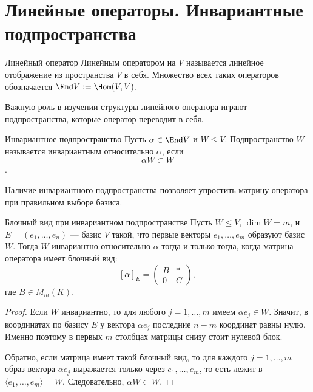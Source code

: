 
\section{Линейные операторы. Инвариантные подпространства}

\begin{Definition}{Линейный оператор}{}
	Линейным оператором на $V$ называется линейное отображение из пространства $V$ в себя. Множество всех таких операторов обозначается $\End V:=\Hom(V,V)$.
\end{Definition}

Важную роль в изучении структуры линейного оператора играют подпространства, которые оператор переводит в себя.

\begin{Definition}{Инвариантное подпространство}{}
	Пусть $\alpha\in \End V$ и $W\le V$. Подпространство $W$ называется инвариантным относительно $\alpha$, если
	\[
	\alpha W\subset W
	\].
\end{Definition}

Наличие инвариантного подпространства позволяет упростить матрицу оператора при правильном выборе базиса.

\begin{Theorem}{Блочный вид при инвариантном подпространстве}{}
	Пусть $W\le V$, $\dim W=m$, и $E=(e_1,\ldots,e_n)$ --- базис $V$ такой, что первые векторы $e_1,\ldots,e_m$ образуют базис $W$. Тогда $W$ инвариантно относительно $\alpha$ тогда и только тогда, когда матрица оператора имеет блочный вид:
	\[
	[\alpha]_E=
	\begin{pmatrix}
		B & *\\
		0 & C
	\end{pmatrix},
	\]
	где $B\in M_m(K)$.
\end{Theorem}

\begin{proof}
	Если $W$ инвариантно, то для любого $j=1,\ldots,m$ имеем $\alpha e_j\in W$. Значит, в координатах по базису $E$ у вектора $\alpha e_j$ последние $n-m$ координат равны нулю. Именно поэтому в первых $m$ столбцах матрицы снизу стоит нулевой блок.

	Обратно, если матрица имеет такой блочный вид, то для каждого $j=1,\ldots,m$ образ вектора $\alpha e_j$ выражается только через $e_1,\dots,e_m$, то есть лежит в $\langle e_1,\ldots,e_m\rangle=W$. Следовательно, $\alpha W\subset W$.
\end{proof}

